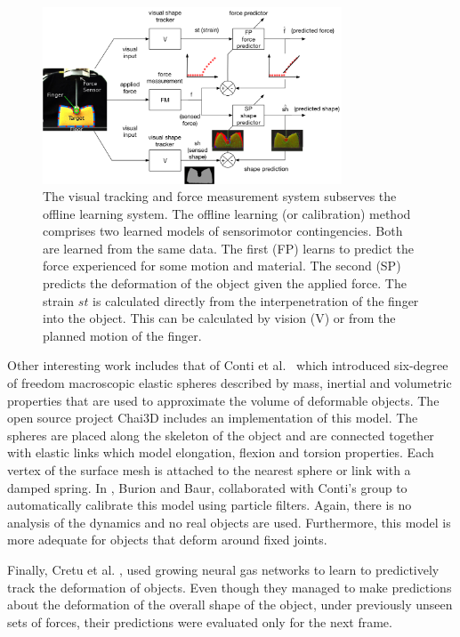 \documentclass[journal]{IEEEtran}
\begin{document}
\begin{figure}[!t]
\centering
\includegraphics[width=3.5in]{figures/learning.png}%
\caption{The visual tracking and force measurement system subserves the offline learning system. The offline learning (or calibration) method comprises two learned models of sensorimotor contingencies. Both are learned from the same data. The first (FP) learns to predict the force experienced for some motion and material. The second (SP) predicts the deformation of the object given the applied force. The strain $st$ is calculated directly from the interpenetration of the finger into the object. This can be calculated by vision (V) or from the planned motion of the finger.}
\label{fig:learning}
\end{figure}

Other interesting work includes that of Conti et al.\ \cite{Conti2003} which introduced six-degree of freedom macroscopic elastic spheres described by mass, inertial and volumetric properties that are used to approximate the volume of deformable objects. The open source project Chai3D includes an implementation of this model. The spheres are placed along the skeleton of the object and are connected together with elastic links which model elongation, flexion and torsion properties. Each vertex of the surface mesh is attached to the nearest sphere or link with a damped spring.  In \cite{Burion2008}, Burion and Baur, collaborated with Conti's group to automatically calibrate this model using particle filters.  Again, there is no analysis of the dynamics and no real objects are used.  Furthermore, this model is more adequate for objects that deform around fixed joints.

Finally, Cretu et al. \cite{Cretu2012}, used growing neural gas networks to learn to predictively track the deformation of objects.  Even though they managed to make predictions about the deformation of the overall shape of the object, under previously unseen sets of forces, their predictions were evaluated only for the next frame.
\end{document}
